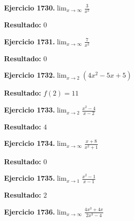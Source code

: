 \documentclass[10pt,a4paper]{article}
\begin{document}
\begin{ejbox}
\textbf{Ejercicio 1730.}\quad $\lim_{x\to \infty} \frac{3}{x^2}$
\end{ejbox}

\begin{solbox}
\textbf{Resultado:} \(\displaystyle 0\)
\end{solbox}

\begin{ejbox}
\textbf{Ejercicio 1731.}\quad $\lim_{x\to \infty} \frac{7}{x^2}$
\end{ejbox}

\begin{solbox}
\textbf{Resultado:} \(\displaystyle 0\)
\end{solbox}

\newpage
\begin{ejbox}
\textbf{Ejercicio 1732.}\quad $\lim_{x\to 2} (4x^2 -5x +5)$
\end{ejbox}

\begin{solbox}
\textbf{Resultado:} \(\displaystyle f(2) = 11\)
\end{solbox}

\begin{ejbox}
\textbf{Ejercicio 1733.}\quad $\lim_{x\to 2} \frac{x^2-4}{x-2}$
\end{ejbox}

\begin{solbox}
\textbf{Resultado:} \(\displaystyle 4\)
\end{solbox}

\begin{ejbox}
\textbf{Ejercicio 1734.}\quad $\lim_{x\to \infty} \frac{x + 8}{x^2 + 1}$
\end{ejbox}

\begin{solbox}
\textbf{Resultado:} \(\displaystyle 0\)
\end{solbox}

\newpage
\begin{ejbox}
\textbf{Ejercicio 1735.}\quad $\lim_{x\to 1} \frac{x^2-1}{x-1}$
\end{ejbox}

\begin{solbox}
\textbf{Resultado:} \(\displaystyle 2\)
\end{solbox}

\begin{ejbox}
\textbf{Ejercicio 1736.}\quad $\lim_{x\to \infty} \frac{4x^3 + 4x}{2x^3 - 4}$
\end{ejbox}
\end{document}
